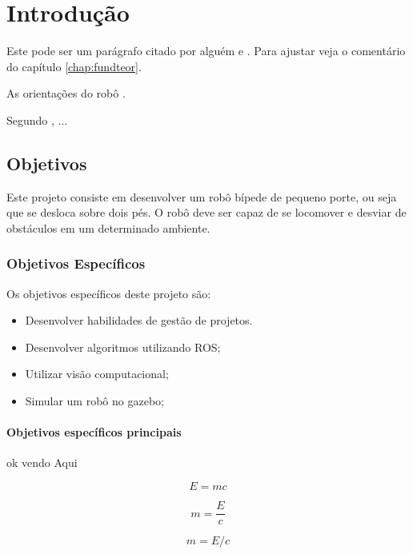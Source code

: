 \chapter{Introdução}
\label{chap:intro}

Este pode ser um parágrafo citado por alguém \cite{Barabasi2003-1} e \cite{barabasi2003linked}.
Para ajustar veja o comentário do capítulo \ref{chap:fundteor}.

As orientações do robô \cite{aperea-1}.

Segundo , ...

\section{Objetivos}
\label{sec:obj}
Este projeto consiste em desenvolver um robô bípede de pequeno porte, ou seja que se desloca sobre dois pés. O robô deve ser capaz de se locomover e desviar de obstáculos em um determinado ambiente. 
\label{sec:obj}

\subsection{Objetivos Específicos}
\label{ssec:objesp}
Os objetivos específicos deste projeto são:
\begin{itemize}
      \item Desenvolver habilidades de gestão de projetos.
      \item Desenvolver algoritmos utilizando ROS;
      \item Utilizar visão computacional;
      \item Simular um robô no gazebo;
  \end{itemize}

\subsubsection*{Objetivos específicos principais}
\label{sssec:obj-principais}
ok vendo Aqui


\begin{equation}
  E=mc
\end{equation}


\begin{equation*}
  m=\frac{E}{c}
\end{equation*}

\begin{equation}
  m=E/c
\end{equation}



